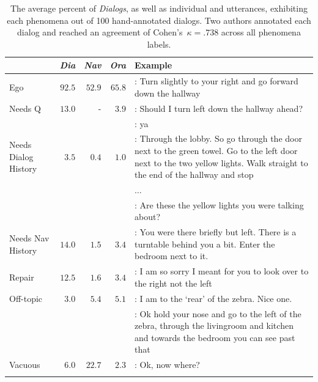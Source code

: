 \begin{table}[ht]
\centering
\begin{small}
\begin{tabular}{p{1.4cm}rrrp{8.5cm}}
    & \textbf{\textit{Dia}} & \textbf{\textit{Nav}} & \textbf{\textit{Ora}} & \textbf{Example} \\
    \toprule
    Ego & $92.5$ & $52.9$ & $65.8$ & \ora{}: Turn slightly to {\color{blue}your right} and go {\color{blue}forward} down the hallway \\
    \cmidrule{5-5}
    Needs Q & $13.0$ & - & $3.9$ & \nav{}: Should I turn left down the hallway ahead? \\
    & & & &  \ora{}: {\color{blue}ya} \\
    \cmidrule{5-5}
    Needs Dialog History & $3.5$ & $0.4$ & $1.0$ & \ora{}: Through the lobby. So go through the door next to the green towel. Go to the left door next to {\color{blue}the two yellow lights}. Walk straight to the end of the hallway and stop \\
    & & & & $\dots$ \\
    & & & & \nav{}: Are these {\color{blue}the yellow lights} you were talking about? \\
    \cmidrule{5-5}
    Needs Nav History & $14.0$ & $1.5$ & $3.4$ & \ora{}: {\color{blue}You were there briefly but left}. There is a turntable behind you a bit. Enter the bedroom next to it. \\
    \cmidrule{5-5}
    Repair & $12.5$ & $1.6$ & $3.4$ & \ora{}: I am so sorry {\color{blue}I meant for you to look over to the right not the left} \\
    \cmidrule{5-5}
    Off-topic & $3.0$ & $5.4$ & $5.1$ & \nav{}: I am to the `rear' of the zebra. {\color{blue}Nice one.} \\
    & & & & \ora{}: {\color{blue}Ok hold your nose} and go to the left of the zebra, through the livingroom and kitchen and towards the bedroom you can see past that \\
    \cmidrule{5-5}
    Vacuous & $6.0$ & $22.7$ & $2.3$ & \nav{}: {\color{blue}Ok, now where?} \\
    \bottomrule \\
\end{tabular}
\end{small}
\caption{
The average percent of \textit{Dialogs}, as well as individual \nav{} and \ora{} utterances, exhibiting each phenomena out of 100 hand-annotated dialogs.
Two authors annotated each dialog and reached an agreement of Cohen's~$\kappa=.738$ across all phenomena labels.
}
\vspace{-8mm}
\label{tab:analysis}
\end{table}

